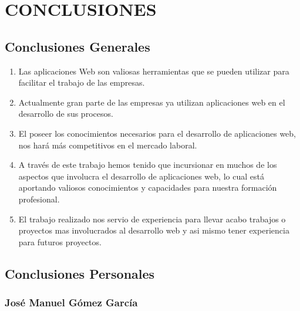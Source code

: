 \chapter*{CONCLUSIONES}
{
	\section{Conclusiones Generales}
	\fontsize{12pt}{10mm}\selectfont
	\begin{enumerate}
		\item Las aplicaciones Web son valiosas herramientas que se pueden utilizar para facilitar el trabajo de las empresas.
		\vspace{6mm}
		
		\item Actualmente gran parte de las empresas ya utilizan aplicaciones web en el desarrollo de sus procesos.
		\vspace{6mm}
		
		\item El poseer los conocimientos necesarios para el desarrollo de aplicaciones web, nos hará más competitivos en el mercado laboral.
		\vspace{6mm}
		
		\item A través de este trabajo hemos tenido que incursionar en muchos de los aspectos que involucra el desarrollo de aplicaciones web, lo cual está aportando valiosos conocimientos y capacidades para nuestra formación profesional.
		\vspace{6mm}
		
		\item El trabajo realizado nos servio de experiencia para llevar acabo trabajos o proyectos mas involucrados al desarrollo web y asi mismo tener experiencia para futuros proyectos.   
  
		\vspace{6mm}
	\end{enumerate}
}

\clearpage
\section{Conclusiones Personales}

\subsection{José Manuel Gómez García}
	
